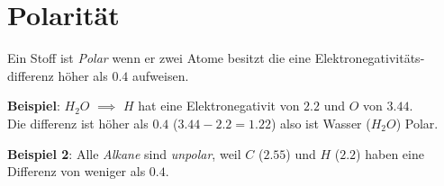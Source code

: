 \section{Polarität}
Ein Stoff ist \textit{Polar} wenn er zwei Atome besitzt die eine Elektronegativitäts-differenz höher als $0.4$ aufweisen.

\textbf{Beispiel}: $H_2O$ $\implies$ $H$ hat eine Elektronegativit von $2.2$ und $O$ von $3.44$. \\
Die differenz ist höher als $0.4$ ($3.44-2.2=1.22$) also ist Wasser ($H_2O$) Polar.

\textbf{Beispiel 2}: Alle \textit{Alkane} sind \textit{unpolar}, weil $C$ ($2.55$) und $H$ ($2.2$) haben eine Differenz von weniger als $0.4$.

